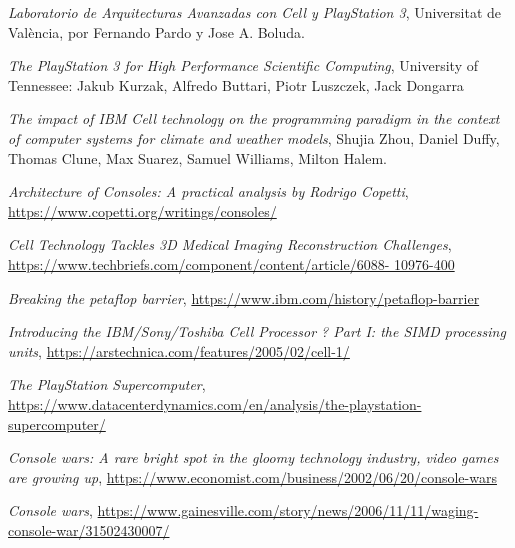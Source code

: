 \documentclass[10pt,compsoc]{IEEEtran}
\begin{document}
	\begin{thebibliography}{1}
	
			{\it{Laboratorio de Arquitecturas Avanzadas con Cell y PlayStation 3}}, Universitat de València, por Fernando Pardo y Jose A. Boluda.\newline
			
			{\it{The PlayStation 3 for High Performance Scientific Computing}}, University of Tennessee: Jakub Kurzak, Alfredo Buttari, Piotr Luszczek, Jack Dongarra\newline
			
			{\it{The impact of IBM Cell technology on the programming paradigm in the context of computer systems	for climate and weather	models}}, Shujia Zhou, Daniel Duffy, Thomas Clune, Max Suarez, 	Samuel Williams, Milton Halem.\newline
			
			{\it{Architecture of Consoles: A practical analysis by Rodrigo Copetti}}, 
			\url{https://www.copetti.org/writings/consoles/}\newline
			
			{\it{Cell Technology Tackles 3D Medical Imaging Reconstruction Challenges}},
			\url{https://www.techbriefs.com/component/content/article/6088-
				10976-400}\newline
			
			{\it{Breaking the petaflop barrier}},
			\url{https://www.ibm.com/history/petaflop-barrier}\newline
			
			{\it{Introducing the IBM/Sony/Toshiba Cell Processor ? Part I: the SIMD processing units}},
			\url{https://arstechnica.com/features/2005/02/cell-1/}\newline
			
			{\it{The PlayStation Supercomputer}},
			\url{https://www.datacenterdynamics.com/en/analysis/the-playstation-supercomputer/}\newline
	
			{\it{Console wars: A rare bright spot in the gloomy technology industry, video games are growing up}}, 
			\url{https://www.economist.com/business/2002/06/20/console-wars}\newline
			

			{\it{Console wars}},
			\url{https://www.gainesville.com/story/news/2006/11/11/waging-console-war/31502430007/}\newline
			

\end{thebibliography}
\end{document}
